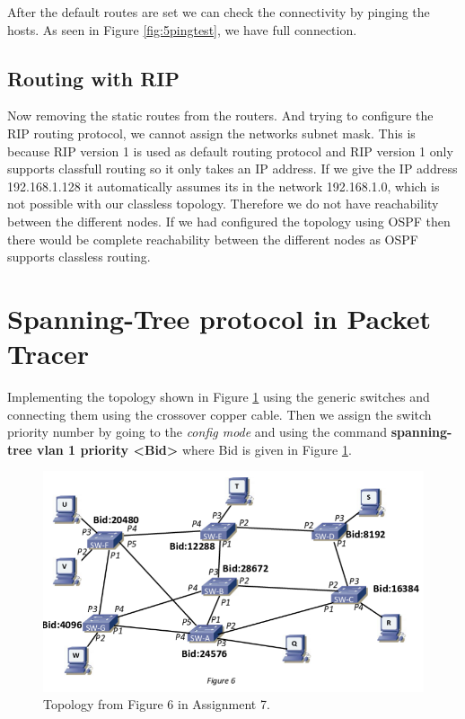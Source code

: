 \documentclass{article}
\begin{document}
After the default routes are set we can check the connectivity by pinging the hosts. As seen in Figure \ref{fig:5pingtest}, we have full connection.

\subsection{Routing with RIP}

Now removing the static routes from the routers. And trying to configure the RIP routing protocol, we cannot assign the networks subnet mask. This is because RIP version 1 is used as default routing protocol and RIP version 1 only supports classfull routing so it only takes an IP address. If we give the IP address 192.168.1.128 it automatically assumes its in the network 192.168.1.0, which is not possible with our classless topology. Therefore we do not have reachability between the different nodes. If we had configured the topology using OSPF then there would be complete reachability between the different nodes as OSPF supports classless routing. 

\section{Spanning-Tree protocol in Packet Tracer}

Implementing the topology shown in Figure \ref{fig:6topassign} using the generic switches and connecting them using the crossover copper cable. Then we assign the switch priority number by going to the \textit{config mode} and using the command \textbf{spanning-tree vlan 1 priority {\textless}Bid{\textgreater}} where Bid is given in Figure \ref{fig:6topassign}. 

\begin{figure}[h]
    \centering
    \includegraphics[scale=0.3]{6topassign}
    \caption{Topology from Figure 6 in Assignment 7. }
    \label{fig:6topassign}
\end{figure}
\end{document}
